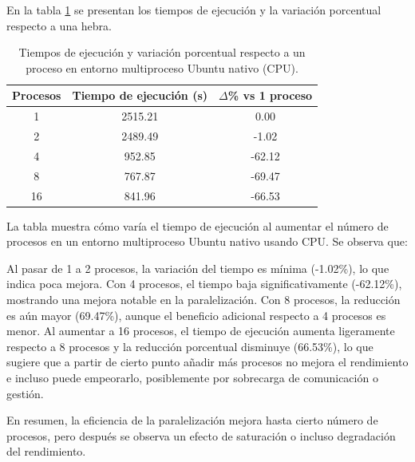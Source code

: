 En la tabla \ref{tab:multi-node_ubuntu_cpu_native} se presentan los tiempos de ejecución y la variación porcentual respecto a una hebra.

\begin{table}[ht]
    \centering
    \begin{tabular}{|c|c|c|}
        \hline
        \textbf{Procesos} & \textbf{Tiempo de ejecución (s)} & \textbf{$\Delta$\% vs 1 proceso} \\
        \hline
        1                 & 2515.21                          & 0.00                             \\
        2                 & 2489.49                          & -1.02                            \\
        4                 & 952.85                           & -62.12                           \\
        8                 & 767.87                           & -69.47                           \\
        16                & 841.96                           & -66.53                           \\
        \hline
    \end{tabular}
    \caption{Tiempos de ejecución y variación porcentual respecto a un proceso en entorno multiproceso Ubuntu nativo (CPU).}
    \label{tab:multi-node_ubuntu_cpu_native}
\end{table}

La tabla muestra cómo varía el tiempo de ejecución al aumentar el número de procesos en un entorno multiproceso Ubuntu nativo usando CPU. Se observa que:

Al pasar de 1 a 2 procesos, la variación del tiempo es mínima (-1.02\%), lo que indica poca mejora.
Con 4 procesos, el tiempo baja significativamente (-62.12\%), mostrando una mejora notable en la paralelización.
Con 8 procesos, la reducción es aún mayor (69.47\%), aunque el beneficio adicional respecto a 4 procesos es menor.
Al aumentar a 16 procesos, el tiempo de ejecución aumenta ligeramente respecto a 8 procesos y la reducción porcentual disminuye (66.53\%), lo que sugiere que a partir de cierto punto añadir más procesos no mejora el rendimiento e incluso puede empeorarlo, posiblemente por sobrecarga de comunicación o gestión.

En resumen, la eficiencia de la paralelización mejora hasta cierto número de procesos, pero después se observa un efecto de saturación o incluso degradación del rendimiento.

